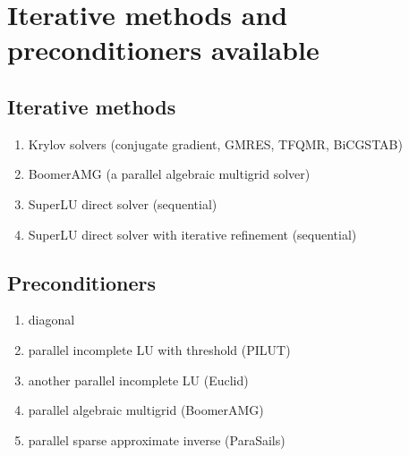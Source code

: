 \section{Iterative methods and preconditioners available}

\subsection{Iterative methods}

\begin{enumerate}
\item Krylov solvers (conjugate gradient, GMRES, TFQMR, BiCGSTAB)
\item BoomerAMG (a parallel algebraic multigrid solver)
\item SuperLU direct solver (sequential)
\item SuperLU direct solver with iterative refinement (sequential)
\end{enumerate}

\subsection{Preconditioners}

\begin{enumerate}
\item diagonal
\item parallel incomplete LU with threshold (PILUT)
\item another parallel incomplete LU (Euclid)
\item parallel algebraic multigrid (BoomerAMG)
\item parallel sparse approximate inverse (ParaSails)
\end{enumerate}


